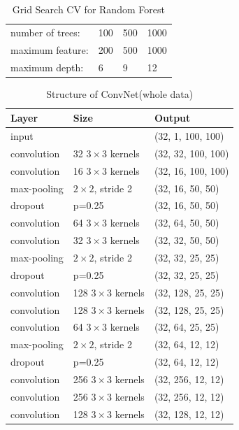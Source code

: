 \documentclass[11pt,oneside,a4paper]{article}
\numberwithin{equation}{section}
\begin{document}
\begin{table}[ht]
\centering
\small
\caption{Grid Search CV for Random Forest}
\label{cv:rf}
\begin{tabular}{llll}
\toprule
number of trees: & 100 & 500 & 1000 \\
maximum feature:     &200  & 500 & 1000   \\
maximum depth:    & 6   & 9   & 12  \\
\bottomrule
\end{tabular}
\end{table}


\begin{table}[ht]
\centering
\caption{Structure of ConvNet(whole data)}
\begin{tabular}{lll}
\hline
Layer           & Size             & Output             \\ \hline
input           &                  & (32, 1, 100, 100)  \\
convolution     & 32 $3 \times 3$ kernels   & (32, 32, 100, 100) \\
convolution     & 16 $3 \times 3$ kernels   & (32, 16, 100, 100) \\
max-pooling     & $2 \times 2$, stride 2    & (32, 16, 50, 50)   \\
dropout         & p=0.25           & (32, 16, 50, 50)   \\
convolution     & 64 $3 \times 3$ kernels   & (32, 64, 50, 50)   \\
convolution     & 32 $3 \times 3$ kernels   & (32, 32, 50, 50)   \\
max-pooling     & $2 \times 2$, stride 2    & (32, 32, 25, 25)   \\
dropout         & p=0.25           & (32, 32, 25, 25)   \\
convolution     & 128 $3 \times 3$ kernels  & (32, 128, 25, 25)  \\
convolution     & 128 $3 \times 3$ kernels  & (32, 128, 25, 25)  \\
convolution     & 64 $3 \times 3$ kernels   & (32, 64, 25, 25)   \\
max-pooling     & $2 \times 2$, stride 2    & (32, 64, 12, 12)   \\
dropout         & p=0.25           & (32, 64, 12, 12)   \\
convolution     & 256 $3 \times 3$ kernels  & (32, 256, 12, 12)  \\
convolution     & 256 $3 \times 3$ kernels  & (32, 256, 12, 12)   \\
convolution     & 128 $3 \times 3$ kernels  & (32, 128, 12, 12)  \\

\end{tabular}
\end{table}
\end{document}
